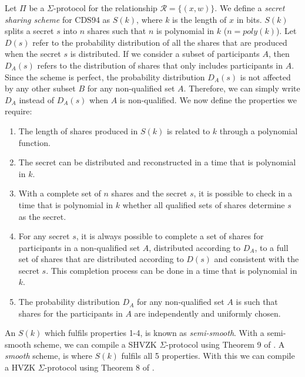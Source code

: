 \begin{definition}\label{def:secret-sharing}
Let $\Pi$ be a $\Sigma$-protocol for the relationship $\mathcal R = \{(x,w)\}$. We define a \textit{secret sharing scheme} for CDS94 as $S(k)$, where $k$ is the length of $x$ in bits. $S(k)$ splits a secret $s$ into $n$ shares such that $n$ is polynomial in $k$ ($n = poly(k)$). Let $D(s)$ refer to the probability distribution of all the shares that are produced when the secret $s$ is distributed. If we consider a subset of participants $A$, then $D_A(s)$ refers to the distribution of shares that only includes participants in $A$. Since the scheme is perfect, the probability distribution $D_A(s)$ is not affected by any other subset $B$ for any non-qualified set $A$. Therefore, we can simply write $D_A$ instead of $D_A(s)$ when $A$ is non-qualified. We now define the properties we require:
    \begin{enumerate}
        \item The length of shares produced in $S(k)$ is related to $k$ through a polynomial function.
        \item The secret can be distributed and reconstructed in a time that is polynomial in $k$.
        \item With a complete set of $n$ shares and the secret $s$, it is possible to check in a time that is polynomial in $k$ whether all qualified sets of shares determine $s$ as the secret.
        \item For any secret $s$, it is always possible to complete a set of shares for participants in a non-qualified set $A$, distributed according to $D_A$, to a full set of shares that are distributed according to $D(s)$ and consistent with the secret $s$. This completion process can be done in a time that is polynomial in $k$.
        \item The probability distribution $D_A$ for any non-qualified set $A$ is such that shares for the participants in $A$ are independently and uniformly chosen.
    \end{enumerate}
\end{definition}

An $S(k)$ which fulfils properties 1-4, is known as \textit{semi-smooth}. With a semi-smooth scheme, 
we can compile a SHVZK $\Sigma$-protocol using Theorem 9 of \cite{CDS94}. A \textit{smooth} scheme, is where $S(k)$ 
fulfils all 5 properties. With this we can compile a HVZK $\Sigma$-protocol using Theorem 8 of \cite{CDS94}.

